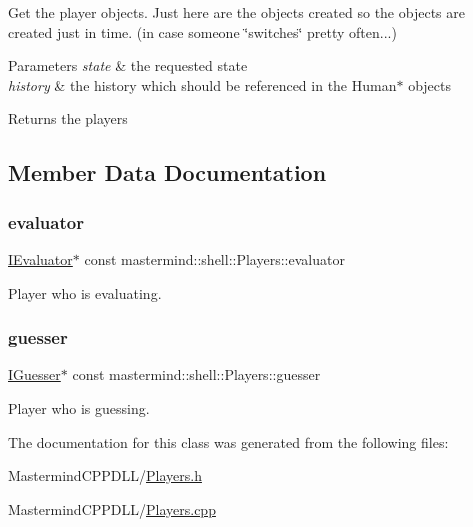 Get the player objects. Just here are the objects created so the objects are created just in time. (in case someone \char`\"{}switches\char`\"{} pretty often...) 


\begin{DoxyParams}{Parameters}
{\em state} & the requested state \\
\hline
{\em history} & the history which should be referenced in the Human$\ast$ objects \\
\hline
\end{DoxyParams}
\begin{DoxyReturn}{Returns}
the players 
\end{DoxyReturn}


\subsection{Member Data Documentation}
\hypertarget{classmastermind_1_1shell_1_1_players_ab5def272c1a430a8d0c388a93e7479d3}{}\label{classmastermind_1_1shell_1_1_players_ab5def272c1a430a8d0c388a93e7479d3} 
\subsubsection{\texorpdfstring{evaluator}{evaluator}}
{\footnotesize\ttfamily \hyperlink{classmastermind_1_1logic_1_1_i_evaluator}{I\+Evaluator}$\ast$ const mastermind\+::shell\+::\+Players\+::evaluator\hspace{0.3cm}{\ttfamily [private]}}



Player who is evaluating. 

\hypertarget{classmastermind_1_1shell_1_1_players_aec78e6a571eed40e72d1822da38346cb}{}\label{classmastermind_1_1shell_1_1_players_aec78e6a571eed40e72d1822da38346cb} 
\subsubsection{\texorpdfstring{guesser}{guesser}}
{\footnotesize\ttfamily \hyperlink{classmastermind_1_1logic_1_1_i_guesser}{I\+Guesser}$\ast$ const mastermind\+::shell\+::\+Players\+::guesser\hspace{0.3cm}{\ttfamily [private]}}



Player who is guessing. 



The documentation for this class was generated from the following files\+:\begin{DoxyCompactItemize}
\item 
Mastermind\+C\+P\+P\+D\+L\+L/\hyperlink{_players_8h}{Players.\+h}\item 
Mastermind\+C\+P\+P\+D\+L\+L/\hyperlink{_players_8cpp}{Players.\+cpp}\end{DoxyCompactItemize}
